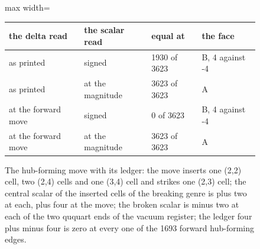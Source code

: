 \begin{figure}[htbp]
\footnotesize
\begin{adjustbox}{max width=\linewidth}\begin{tabular}{llll}
the delta read & the scalar read & equal at & the face \\ \hline
as printed & signed & 1930 of 3623 & B, 4 against -4 \\
as printed & at the magnitude & 3623 of 3623 & A \\
at the forward move & signed & 0 of 3623 & B, 4 against -4 \\
at the forward move & at the magnitude & 3623 of 3623 & A \\
\end{tabular}\end{adjustbox}
\caption{The hub-forming move with its ledger: the move inserts one (2,2) cell, two (2,4) cells and one (3,4) cell and strikes one (2,3) cell; the central scalar of the inserted cells of the breaking genre is plus two at each, plus four at the move; the broken scalar is minus two at each of the two ququart ends of the vacuum register; the ledger four plus minus four is zero at every one of the 1693 forward hub-forming edges.}\label{fig:I-4-D544596-hub-forming-ledger}
\end{figure}

